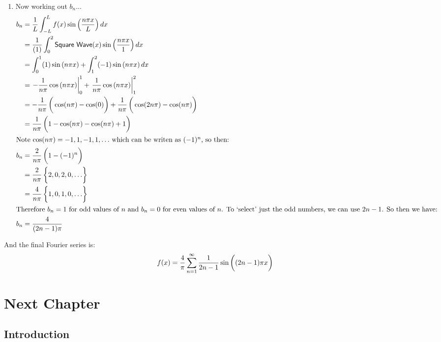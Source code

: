 \documentclass[11pt,letterpaper,twoside]{book}
\newenvironment{mathstuff}
   {\cbcolor{black}\par \vspace{8pt} \cbstart \vspace{-15pt} \begin{enumerate} \item[]}
   {\end{enumerate} \vspace{-5pt} \cbend \par \vspace{7pt} }
\begin{document}
\begin{mathstuff}
Now working out $b_n$...
\begin{align*}
b_n &= \frac{1}{L} \int_{-L}^L f(x) \sin \left( \frac{n\pi x}{L} \right) dx \\
    &= \frac{1}{(1)} \int_0^2 \mathsf{Square\ Wave}(x) \sin \left( \frac{n\pi x}{1} \right) dx \\
    &= \int_0^1 (1) \sin \left( n\pi x \right) + \int_1^2 (-1) \sin \left( n\pi x \right) dx \\
    &= \left. -\frac{1}{n \pi} \cos \left( n\pi x \right)\right|^1_0 + \left. \frac{1}{n \pi} \cos \left( n\pi x \right)\right|^2_1 \\
    &= -\frac{1}{n \pi} \left( \vphantom{\frac{1}{2}} \cos ( n\pi ) - \cos ( 0 ) \right) + \frac{1}{n \pi} \left( \vphantom{\frac{1}{2}} \cos(2n\pi) - \cos(n\pi) \right) \\ 
    &= \frac{1}{n \pi} \left( \vphantom{\frac{1}{2}} 1 - \cos(n\pi) - \cos(n\pi) + 1\right) \\
\intertext{Note $\cos(n\pi) = -1, 1, -1, 1, \ldots$\ which can be writen as $(-1)^n$, so then: }
b_n &= \frac{2}{n \pi} \left( \vphantom{\frac{1}{2}} 1 - (-1)^n \right) \\
    &= \frac{2}{n \pi} \left\{ \vphantom{\frac{1}{2}} 2, 0, 2, 0, \ldots \right\} \\
    &= \frac{4}{n \pi} \left\{ \vphantom{\frac{1}{2}} 1, 0, 1, 0, \ldots \right\} \\
\intertext{Therefore $b_n = 1$ for odd values of $n$ and $b_n = 0$ for even values of $n$.  To `select' just the odd numbers, we can use $2n - 1$.  So then we have:} 
b_n &= \frac{4}{(2n - 1)\pi} 
\end{align*}
\end{mathstuff}

And the final Fourier series is:
\[
f(x) = \frac{4}{\pi} \sum^\infty_{n = 1} \frac{1}{2n - 1} \sin \left( (2n - 1) \pi \vphantom{\frac{1}{2}} x \right)
\]

\lipsum[16-17]


\chapter{Next Chapter}

\section{Introduction}

\lipsum[17-18]
\end{document}
